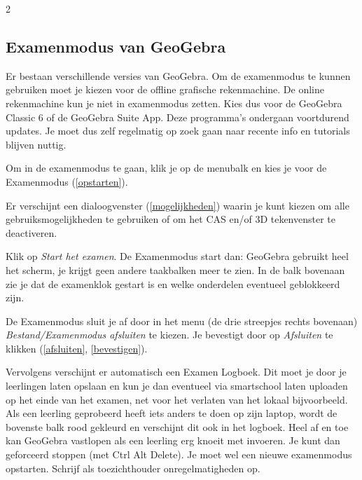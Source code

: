 \begin{multicols}{2}

\subsection*     {Examenmodus van GeoGebra}
Er bestaan verschillende versies van GeoGebra. Om de examenmodus te kunnen gebruiken moet je kiezen voor de offline grafische rekenmachine. De online rekenmachine kun je niet in examenmodus zetten. Kies dus voor de GeoGebra Classic 6 of de GeoGebra Suite App. Deze programma's ondergaan voortdurend updates. Je moet dus zelf regelmatig op zoek gaan naar recente info en tutorials blijven nuttig.

Om in de examenmodus te gaan, klik je op de menubalk en kies je voor de Examenmodus (\autoref{opstarten}).


Er verschijnt een dialoogvenster (\autoref{mogelijkheden}) waarin je kunt kiezen om alle gebruiksmogelijkheden te gebruiken of om het CAS en/of 3D tekenvenster te deactiveren.

Klik op \emph{Start het examen}. De Examenmodus start dan: GeoGebra gebruikt heel het scherm, je krijgt geen andere taakbalken meer te zien. In de balk bovenaan zie je dat de examenklok gestart is en welke onderdelen eventueel geblokkeerd zijn. 

De Examenmodus sluit je af door in het menu (de drie streepjes rechts bovenaan) \emph{Bestand/Examenmodus afsluiten} te kiezen.
Je bevestigt door op \emph{Afsluiten} te klikken (\autoref{afsluiten}, \autoref{bevestigen}).

Vervolgens verschijnt er automatisch een Examen Logboek. Dit moet je door je leerlingen laten opslaan en kun je dan eventueel via smartschool laten uploaden op het einde van het examen, net voor het verlaten van het lokaal bijvoorbeeld. 
Als een leerling geprobeerd heeft iets anders te doen op zijn laptop, wordt de bovenste balk rood gekleurd en verschijnt dit ook in het logboek.
Heel af en toe kan GeoGebra vastlopen als een leerling erg knoeit met invoeren. Je kunt dan geforceerd stoppen (met Ctrl Alt Delete). Je moet wel een nieuwe examenmodus opstarten. Schrijf als toezichthouder onregelmatigheden op. 


\end{multicols}

